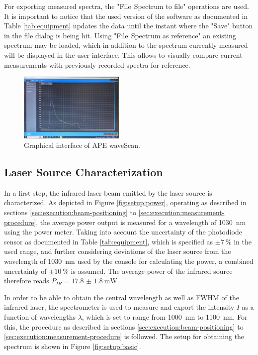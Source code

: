 For exporting measured spectra, the "File$~$\textrightarrow$~$Spectrum to file" operations are used. It is important to notice that the used version of the software as documented in Table \ref{tab:equipment} updates the data until the instant where the "Save" button in the file dialog is being hit. Using "File$~$\textrightarrow$~$Spectrum as reference" an existing spectrum may be loaded, which in addition to the spectrum currently measured will be displayed in the user interface. This allows to visually compare current measurements with previously recorded spectra for reference.

\begin{figure}[H]
    \centering
    \includegraphics[width=0.45\textwidth]{graphics/wave-scan.jpg}
    \caption{Graphical interface of APE waveScan.}
    \label{fig:execution:wave-scan}
\end{figure}

\subsection{Laser Source Characterization}
\label{sec:execution:infrared-characterization}

In a first step, the infrared laser beam emitted by the laser source is characterized. As depicted in Figure \ref{fig:setup:power}, operating as described in sections \ref{sec:execution:beam-positioning} to \ref{sec:execution:measurement-procedure}, the average power output is measured for a wavelength of \SI{1030}{\nm} using the power meter. Taking into account the uncertainty of the photodiode sensor as documented in Table \ref{tab:equipment}, which is specified as $\pm \SI{7}{\percent}$ in the used range, and further considering deviations of the laser source from the wavelength of \SI{1030}{\nm} used by the console for calculating the power, a combined uncertainty of $\pm \SI{10}{\percent}$ is assumed. The average power of the infrared source therefore reads $P_{IR} = \SI{17.8(18)}{\mW}$.

In order to be able to obtain the central wavelength as well as FWHM of the infrared laser, the spectrometer is used to measure and export the intensity $I$ as a function of wavelengths $\lambda$, which is set to range from \SI{1000}{\nm} to \SI{1100}{\nm}. For this, the procedure as described in sections \ref{sec:execution:beam-positioning} to \ref{sec:execution:measurement-procedure} is followed. The setup for obtaining the spectrum is shown in Figure \ref{fig:setup:basic}.

